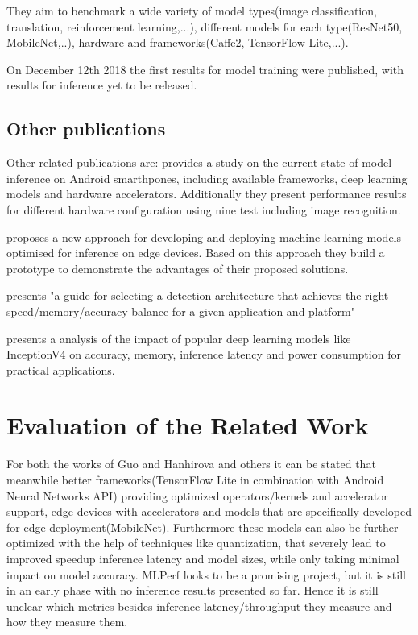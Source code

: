 They aim to benchmark a wide variety of model types(image classification, translation, reinforcement learning,...), different models for each type(ResNet50, MobileNet,..), hardware and frameworks(Caffe2, TensorFlow Lite,...).

On December 12th 2018 the first results for model training were published, with results for inference yet to be released.

\subsection{Other publications}
Other related publications are: 
\cite{DBLP:journals/corr/abs-1810-01109} provides a study on the current state of model inference on Android smarthpones, including available frameworks, deep learning models and hardware accelerators. Additionally they present performance results for different hardware configuration using nine test including image recognition.

\cite{rethinkingDeployment} proposes a new approach for developing and deploying machine learning models optimised for inference on edge devices. Based on this approach they build a prototype to demonstrate the advantages of their proposed solutions.


\cite{DBLP:journals/corr/HuangRSZKFFWSG016} presents "a guide for selecting a detection architecture that achieves the right
speed/memory/accuracy balance for a given application and platform"

\cite{DBLP:journals/corr/CanzianiPC16} presents a analysis of the impact of popular deep learning models like InceptionV4 on accuracy, memory, inference latency and power consumption for practical applications.
\section{Evaluation of the Related Work}
For both the works of Guo\cite{DBLP:conf/ic2e/Guo18} and Hanhirova and others\cite{DBLP:conf/mmsys/HanhirovaKSSHY18} it can be stated that meanwhile better frameworks(TensorFlow Lite in combination with Android Neural Networks API) providing optimized operators/kernels and accelerator support, edge devices with accelerators and models that are specifically developed for edge deployment(MobileNet). Furthermore these models can also be further optimized with the help of techniques like quantization, that severely lead to improved speedup inference latency and model sizes, while only taking minimal impact on model accuracy.
MLPerf looks to be a promising project, but it is still in an early phase with no inference results presented so far. Hence it is still unclear which metrics besides inference latency/throughput they measure and how they measure them.




 \endinput 

